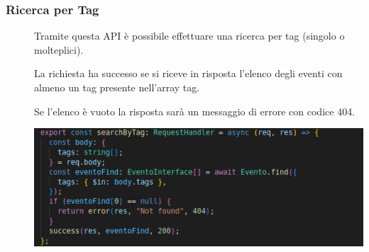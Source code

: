 \documentclass{article}
\begin{document}
\subsubsection{Ricerca per Tag}
\begin{description}
    \item[] Tramite questa API è possibile effettuare una ricerca per tag (singolo o molteplici).
    \item[] La richiesta ha successo se si riceve in risposta l'elenco degli eventi con almeno un tag presente nell'array tag.
    \item[] Se l'elenco è vuoto la risposta sarà un messaggio di errore con codice 404.
    \item[] \begin{center}
            \includegraphics[scale=0.5]{tagEvent.png}
        \end{center}
\end{description}
\end{document}
